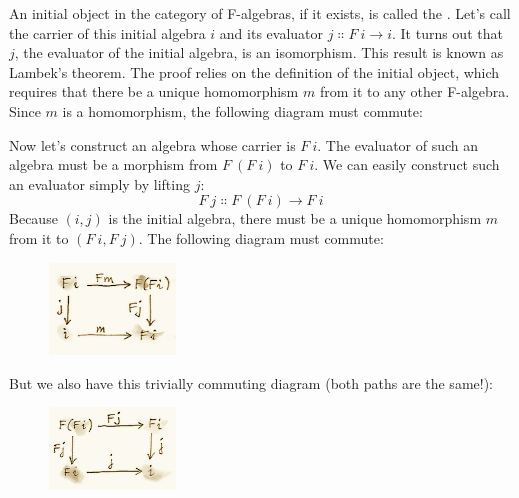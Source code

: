 An initial object in the category of F-algebras, if it exists, is called
the . Let's call the carrier of this initial
algebra $i$ and its evaluator $j \Colon F\ i \to i$. It turns out that $j$,
the evaluator of the initial algebra, is an isomorphism. This result is
known as Lambek's theorem. The proof relies on the definition of the
initial object, which requires that there be a unique homomorphism
$m$ from it to any other F-algebra. Since $m$ is a
homomorphism, the following diagram must commute:

\begin{figure}[H]
\centering
{}
\end{figure}

\noindent
Now let's construct an algebra whose carrier is $F\ i$. The
evaluator of such an algebra must be a morphism from $F\ (F\ i)$
to $F\ i$. We can easily construct such an evaluator simply by
lifting $j$:
\[F\ j \Colon F\ (F\ i) \to F\ i\]
Because $(i, j)$ is the initial algebra, there must be a unique
homomorphism $m$ from it to $(F\ i, F\ j)$. The following
diagram must commute:

\begin{figure}[H]
\centering
\includegraphics[width=0.3\textwidth]{images/alg3a.png}
\end{figure}

\noindent
But we also have this trivially commuting diagram (both paths are the
same!):

\begin{figure}[H]
\centering
\includegraphics[width=0.3\textwidth]{images/alg3.png}
\end{figure}

